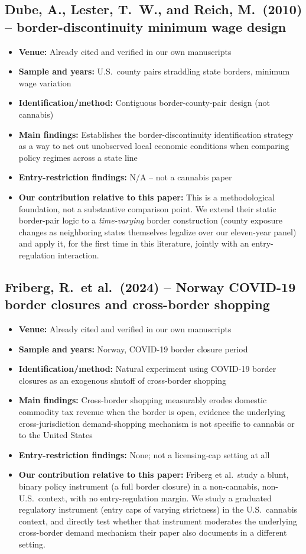 \documentclass[11pt]{article}
\begin{document}
\subsection{Dube, A., Lester, T.\ W., and Reich, M.\ (2010) -- border-discontinuity minimum wage design}
\begin{itemize}
\item \textbf{Venue:} Already cited and verified in our own manuscripts
\item \textbf{Sample and years:} U.S.\ county pairs straddling state borders, minimum wage variation
\item \textbf{Identification/method:} Contiguous border-county-pair design (not cannabis)
\item \textbf{Main findings:} Establishes the border-discontinuity identification strategy as a way to net out
unobserved local economic conditions when comparing policy regimes across a state line
\item \textbf{Entry-restriction findings:} N/A -- not a cannabis paper
\item \textbf{Our contribution relative to this paper:} This is a methodological foundation, not a substantive
comparison point. We extend their static border-pair logic to a \emph{time-varying} border construction
(county exposure changes as neighboring states themselves legalize over our eleven-year panel) and apply it,
for the first time in this literature, jointly with an entry-regulation interaction.
\end{itemize}

\subsection{Friberg, R.\ et al.\ (2024) -- Norway COVID-19 border closures and cross-border shopping}
\begin{itemize}
\item \textbf{Venue:} Already cited and verified in our own manuscripts
\item \textbf{Sample and years:} Norway, COVID-19 border closure period
\item \textbf{Identification/method:} Natural experiment using COVID-19 border closures as an exogenous
shutoff of cross-border shopping
\item \textbf{Main findings:} Cross-border shopping measurably erodes domestic commodity tax revenue when the
border is open, evidence the underlying cross-jurisdiction demand-shopping mechanism is not specific to
cannabis or to the United States
\item \textbf{Entry-restriction findings:} None; not a licensing-cap setting at all
\item \textbf{Our contribution relative to this paper:} Friberg et al.\ study a blunt, binary policy
instrument (a full border closure) in a non-cannabis, non-U.S.\ context, with no entry-regulation margin.
We study a graduated regulatory instrument (entry caps of varying strictness) in the U.S.\ cannabis context,
and directly test whether that instrument moderates the underlying cross-border demand mechanism their paper
also documents in a different setting.
\end{itemize}
\end{document}
